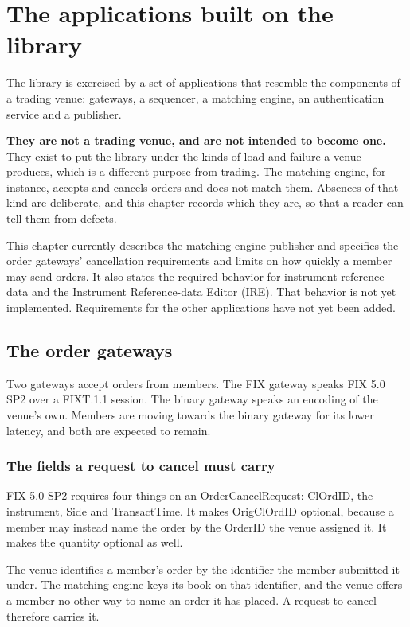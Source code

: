 \chapter{The applications built on the library}
\label{ch:applications}

The library is exercised by a set of applications that resemble the components
of a trading venue: gateways, a sequencer, a matching engine, an authentication
service and a publisher.

\textbf{They are not a trading venue, and are not intended to become one.} They
exist to put the library under the kinds of load and failure a venue produces,
which is a different purpose from trading. The matching engine, for instance,
accepts and cancels orders and does not match them. Absences of that kind are
deliberate, and this chapter records which they are, so that a reader can tell
them from defects.

This chapter currently describes the matching engine publisher and specifies
the order gateways' cancellation requirements and limits on how quickly a
member may send orders. It also states the required behavior for instrument
reference data and the Instrument Reference-data Editor (IRE). That behavior
is not yet implemented. Requirements for the other applications have not yet
been added.

\section{The order gateways}
\label{sec:order_gateways}

Two gateways accept orders from members. The FIX gateway speaks FIX 5.0 SP2 over a
FIXT.1.1 session. The binary gateway speaks an encoding of the venue's own. Members are
moving towards the binary gateway for its lower latency, and both are expected to remain.

\subsection{The fields a request to cancel must carry}
\label{subsec:cancel_required_fields}

FIX 5.0 SP2 requires four things on an OrderCancelRequest: ClOrdID, the instrument, Side
and TransactTime. It makes OrigClOrdID optional, because a member may instead name the
order by the OrderID the venue assigned it. It makes the quantity optional as well.

The venue identifies a member's order by the identifier the member submitted it under. The
matching engine keys its book on that identifier, and the venue offers a member no other
way to name an order it has placed. A request to cancel therefore carries it.

